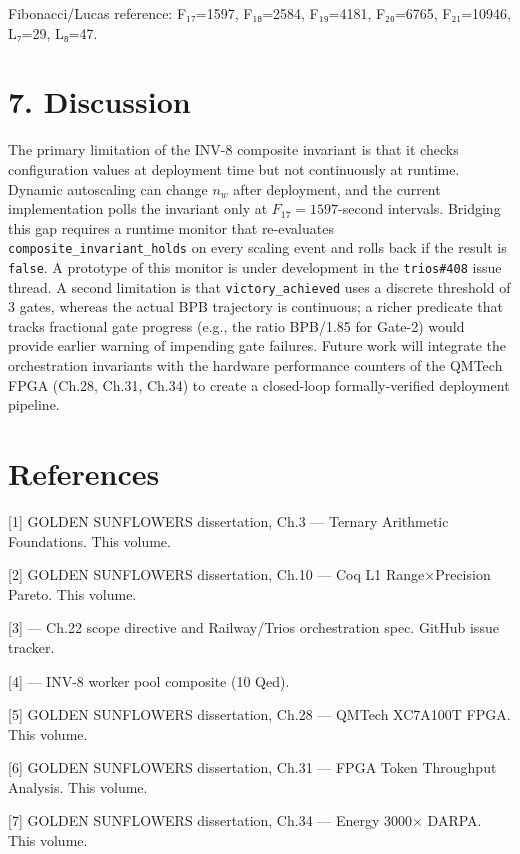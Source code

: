Fibonacci/Lucas reference: F₁₇=1597, F₁₈=2584,
F₁₉=4181, F₂₀=6765, F₂₁=10946, L₇=29, L₈=47.

\section{7. Discussion}\label{fa_22:discussion}

The primary limitation of the INV-8 composite
invariant is that it checks configuration values
at deployment time but not continuously at
runtime. Dynamic autoscaling can change \(n_w\)
after deployment, and the current implementation
polls the invariant only at
\(F_{17} = 1597\)-second intervals. Bridging this
gap requires a runtime monitor that re-evaluates
\texttt{composite\_invariant\_holds} on every
scaling event and rolls back if the result is
\texttt{false}. A prototype of this monitor is
under development in the \texttt{trios\#408} issue
thread. A second limitation is that
\texttt{victory\_achieved} uses a discrete
threshold of 3 gates, whereas the actual BPB
trajectory is continuous; a richer predicate that
tracks fractional gate progress (e.g., the ratio
BPB/1.85 for Gate-2) would provide earlier warning
of impending gate failures. Future work will
integrate the orchestration invariants with the
hardware performance counters of the QMTech FPGA
(Ch.28, Ch.31, Ch.34) to create a closed-loop
formally-verified deployment pipeline.

\section{References}\label{fa_22:references}

[1] GOLDEN SUNFLOWERS dissertation, Ch.3 ---
Ternary Arithmetic Foundations. This volume.

[2] GOLDEN SUNFLOWERS dissertation, Ch.10 ---
Coq L1 Range$\times$Precision Pareto. This volume.

[3]  --- Ch.22
scope directive and Railway/Trios orchestration
spec. GitHub issue tracker.

[4]
--- INV-8 worker pool composite (10 Qed).

[5] GOLDEN SUNFLOWERS dissertation, Ch.28 ---
QMTech XC7A100T FPGA. This volume.

[6] GOLDEN SUNFLOWERS dissertation, Ch.31 ---
FPGA Token Throughput Analysis. This volume.

[7] GOLDEN SUNFLOWERS dissertation, Ch.34 ---
Energy 3000$\times$ DARPA. This volume.

